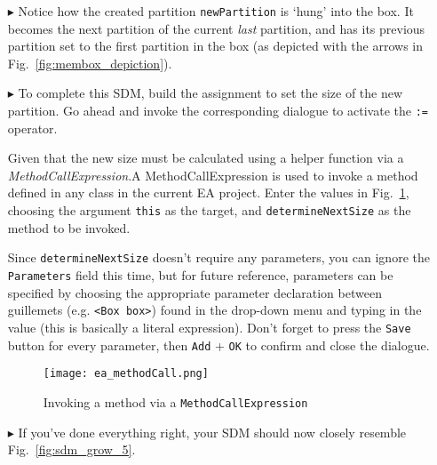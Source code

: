 \begin{itemize}
\item[$\blacktriangleright$] Notice how the created partition \texttt{newPartition} is `hung' into the box. It becomes the next partition of the current
\emph{last} partition, and has its previous partition set to the first partition in the box (as depicted with the arrows in Fig.~\ref{fig:membox_depiction}).
  
\item[$\blacktriangleright$] To complete this SDM, build the assignment to set the size of the new partition. Go ahead and invoke the corresponding dialogue to
activate the \texttt{:=} operator.

Given that the new size must be calculated using a helper function via a \emph{MethodCallExpression}.A MethodCallExpression is
used to invoke a method defined in any class in the current EA project. Enter the values in Fig.~\ref{fig:sdm_grow_4}, choosing the argument \texttt{this} as
the target, and \texttt{determineNextSize} as the method to be invoked. 

Since \texttt{determineNextSize} doesn't require any parameters, you can ignore the \texttt{Parameters} field this time, but for future reference, parameters
can be specified by choosing the appropriate parameter declaration between guillemets (e.g. \texttt{<Box box>}) found in the drop-down menu and typing in the
value (this is basically a literal expression). Don't forget to press the \texttt{Save} button for every parameter, then \texttt{Add} + \texttt{OK} to confirm
and close the dialogue.
 
\begin{figure}[htbp]
\begin{center}
  \texttt{[image: ea\_methodCall.png]}
  \caption{Invoking a method via a \texttt{MethodCallExpression} \update}  
  \label{fig:sdm_grow_4} 
\end{center}
\end{figure}

\item[$\blacktriangleright$]  If you've done everything right, your SDM should now closely resemble Fig.~\ref{fig:sdm_grow_5}. 



\end{itemize}
